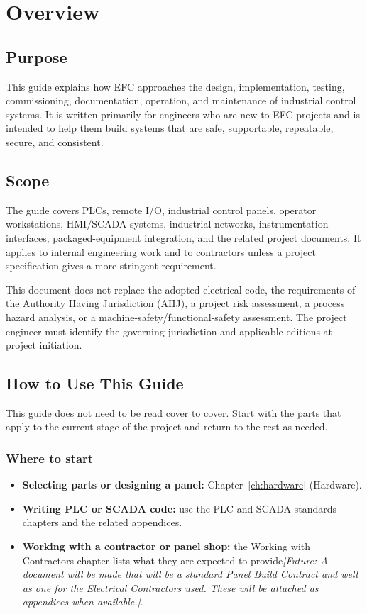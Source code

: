 \chapter{Overview}
\section{Purpose}
This guide explains how EFC approaches the design, implementation, testing, commissioning, documentation, operation, and maintenance of industrial control systems. It is written primarily for engineers who are new to EFC projects and is intended to help them build systems that are safe, supportable, repeatable, secure, and consistent.

\section{Scope}
The guide covers PLCs, remote I/O, industrial control panels, operator workstations, HMI/SCADA systems, industrial networks, instrumentation interfaces, packaged-equipment integration, and the related project documents. It applies to internal engineering work and to contractors unless a project specification gives a more stringent requirement.

This document does not replace the adopted electrical code, the requirements of the Authority Having Jurisdiction (AHJ), a project risk assessment, a process hazard analysis, or a machine-safety/functional-safety assessment. The project engineer must identify the governing jurisdiction and applicable editions at project initiation.

\section{How to Use This Guide}\label{sec:how-to-use}
This guide does not need to be read cover to cover. Start with the parts that apply to the current stage of the project and return to the rest as needed.

\subsection*{Where to start}
\begin{itemize}[itemsep=2pt]
  \item \textbf{Selecting parts or designing a panel:} Chapter~\ref{ch:hardware} (Hardware).
  \item \textbf{Writing PLC or SCADA code:} use the PLC and SCADA standards chapters and the related appendices.
  \item \textbf{Working with a contractor or panel shop:} the Working with Contractors chapter lists what they are expected to provide\textit{\textcolor{futureblue}{[Future: A document will be made that will be a standard Panel Build Contract and well as one for the Electrical Contractors used.  These will be attached as appendices when available.]}}.
\end{itemize}

